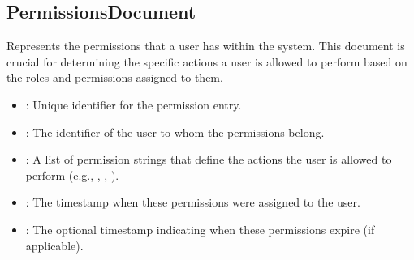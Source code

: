 \documentclass[letterpaper,10pt,english]{sphinxmanual}
\begin{document}
\subsection{PermissionsDocument}
\label{\detokenize{administration_concession_system/authorization_service:permissionsdocument}}
\sphinxAtStartPar
Represents the permissions that a user has within the system. This document is crucial for determining the specific actions a user is allowed to perform based on the roles and permissions assigned to them.
\begin{itemize}
\item {} 
\sphinxAtStartPar
{}: 
\sphinxhyphen{} Unique identifier for the permission entry.

\item {} 
\sphinxAtStartPar
{}: 
\sphinxhyphen{} The identifier of the user to whom the permissions belong.

\item {} 
\sphinxAtStartPar
{}: 
\sphinxhyphen{} A list of permission strings that define the actions the user is allowed to perform (e.g., , , ).

\item {} 
\sphinxAtStartPar
{}: 
\sphinxhyphen{} The timestamp when these permissions were assigned to the user.

\item {} 
\sphinxAtStartPar
{}: 
\sphinxhyphen{} The optional timestamp indicating when these permissions expire (if applicable).

\end{itemize}

\sphinxstepscope
\end{document}
